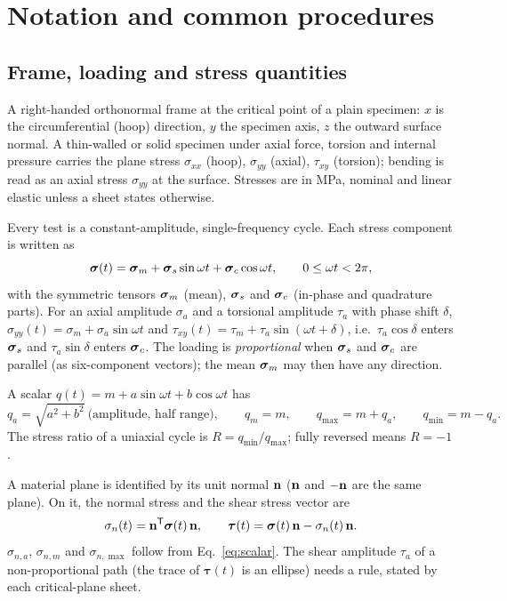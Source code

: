 \section{Notation and common procedures}\label{sec:notation}

\subsection{Frame, loading and stress quantities}

 A right-handed orthonormal frame at the critical point of a plain specimen:
$x$ is the circumferential (hoop) direction, $y$ the specimen axis, $z$ the outward surface
normal. A thin-walled or solid specimen under axial force, torsion and internal pressure carries
the plane stress $\sigma_{xx}$ (hoop), $\sigma_{yy}$ (axial), $\tau_{xy}$ (torsion); bending is
read as an axial stress $\sigma_{yy}$ at the surface. Stresses are in MPa, nominal and linear
elastic unless a sheet states otherwise.

 Every test is a constant-amplitude, single-frequency cycle. Each stress
component is written as
\begin{equation}
\boldsymbol\sigma(t) = \boldsymbol\sigma_m + \boldsymbol\sigma_s\sin\omega t + \boldsymbol\sigma_c\cos\omega t ,\qquad 0\le \omega t < 2\pi ,
\label{eq:harmonic}
\end{equation}
with the symmetric tensors $\boldsymbol\sigma_m$ (mean), $\boldsymbol\sigma_s$ and $\boldsymbol\sigma_c$ (in-phase and quadrature parts). For an
axial amplitude $\sigma_a$ and a torsional amplitude $\tau_a$ with phase shift $\delta$,
$\sigma_{yy}(t) = \sigma_m + \sigma_a\sin\omega t$ and
$\tau_{xy}(t) = \tau_m + \tau_a\sin(\omega t + \delta)$, i.e.\ $\tau_a\cos\delta$ enters $\boldsymbol\sigma_s$ and
$\tau_a\sin\delta$ enters $\boldsymbol\sigma_c$. The loading is \emph{proportional} when $\boldsymbol\sigma_s$ and $\boldsymbol\sigma_c$ are
parallel (as six-component vectors); the mean $\boldsymbol\sigma_m$ may then have any direction.

 A scalar $q(t) = m + a\sin\omega t + b\cos\omega t$ has
\begin{equation}
q_a = \sqrt{a^2+b^2}\ \text{(amplitude, half range)},\qquad q_m = m,\qquad
q_{\max} = m + q_a ,\qquad q_{\min} = m - q_a .
\label{eq:scalar}
\end{equation}
The stress ratio of a uniaxial cycle is $R = q_{\min}/q_{\max}$; fully reversed means $R=-1$.

 A material plane is identified by its unit normal $\mathbf n$ ($\mathbf n$ and $-\mathbf n$
are the same plane). On it, the normal stress and the shear stress vector are
\begin{equation}
\sigma_n(t) = \mathbf n^{\mathsf T}\boldsymbol\sigma(t)\,\mathbf n ,\qquad
\boldsymbol\tau(t) = \boldsymbol\sigma(t)\,\mathbf n - \sigma_n(t)\,\mathbf n .
\label{eq:plane}
\end{equation}
$\sigma_{n,a}$, $\sigma_{n,m}$ and $\sigma_{n,\max}$ follow from Eq.~\eqref{eq:scalar}. The shear
amplitude $\tau_a$ of a non-proportional path (the trace of $\boldsymbol\tau(t)$ is an ellipse)
needs a rule, stated by each critical-plane sheet.


